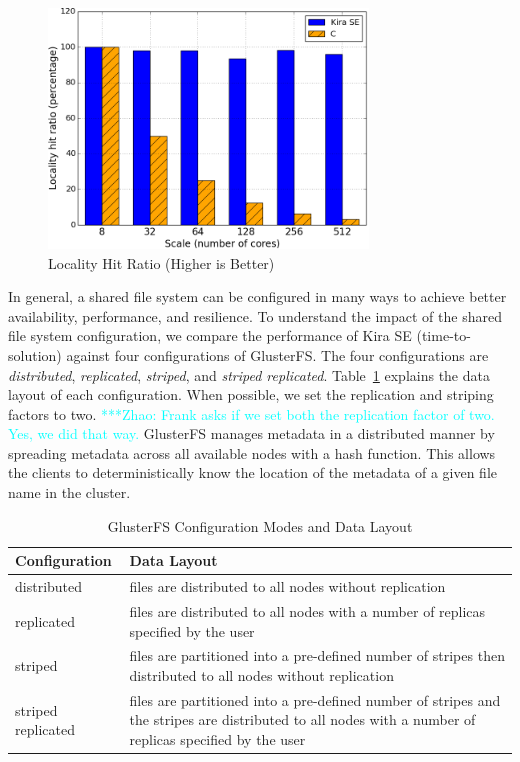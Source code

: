 \documentclass[conference]{IEEEtran}
\newcommand{\zhaonote}[1]{{\textcolor{cyan}    { ***Zhao:      #1 }}}
\newcommand{\zhaonote}[1]{}
\newcommand{\up}{\vspace*{-1em}}
\begin{document}
\begin{figure}[h]
	\begin{center}
		\includegraphics[width=85mm]{pictures/locality}
		\caption{Locality Hit Ratio (Higher is Better)
		\label{fig:locality}}
		\up\up
  	\end{center}
\end{figure}

In general, a shared file system can be configured in many ways to achieve better
availability, performance, and resilience. To understand the impact of the shared
file system configuration, we compare the performance of Kira SE (time-to-solution)
against four configurations of GlusterFS. The four configurations are
\emph{distributed}, \emph{replicated}, \emph{striped}, and \emph{striped replicated}. 
Table~\ref{tb:gluster-conf} explains the data layout of each configuration.
When possible, we set the replication and striping factors to two.
\zhaonote{Frank asks if we set both the replication factor of two. Yes, we did that way.}
GlusterFS manages metadata in a distributed manner by spreading metadata across
all available nodes with a hash function. This allows the clients to deterministically
know the location of the metadata of a given file name in the cluster.

\begin{table}[h]
  \begin{center}
  \caption{GlusterFS Configuration Modes and Data Layout}
    \begin{small}
    \begin{tabular}{ | p{1.65cm} | p{6cm} |}
    \hline
    Configuration & Data Layout \\ \hline \hline
    distributed & files are distributed to all nodes without replication  \\ \hline
    replicated & files are distributed to all nodes with a number of replicas specified by the user \\ \hline  
    striped & files are partitioned into a pre-defined number of stripes then distributed to all nodes without replication \\ \hline
    striped replicated & files are partitioned into a pre-defined number of stripes and the stripes are distributed to all nodes with a number of replicas specified by the user \\ \hline
    \end{tabular}
    \end{small}   
  \label{tb:gluster-conf}     	
  \end{center}
\end{table}
\end{document}
